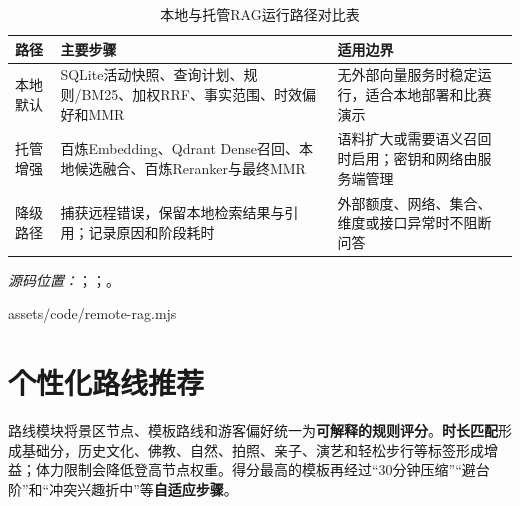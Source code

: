\begin{table}[H]
  \centering
  \small
  \caption{本地与托管RAG运行路径对比表}\label{tab:rag-runtime-paths}
  \begin{tabularx}{\textwidth}{p{}p{}X}
    \toprule
    路径 & 主要步骤 & 适用边界 \\
    \midrule
    本地默认 & SQLite活动快照、查询计划、规则/BM25、加权RRF、事实范围、时效偏好和MMR & 无外部向量服务时稳定运行，适合本地部署和比赛演示 \\
    托管增强 & 百炼Embedding、Qdrant Dense召回、本地候选融合、百炼Reranker与最终MMR & 语料扩大或需要语义召回时启用；密钥和网络由服务端管理 \\
    降级路径 & 捕获远程错误，保留本地检索结果与引用；记录原因和阶段耗时 & 外部额度、网络、集合、维度或接口异常时不阻断问答 \\
    \bottomrule
  \end{tabularx}
\end{table}

\newpage
\noindent\textit{源码位置：}；；。

  {assets/code/remote-rag.mjs}

\newpage
\section{个性化路线推荐}

路线模块将景区节点、模板路线和游客偏好统一为\textbf{可解释的规则评分}。\textbf{时长匹配}形成基础分，历史文化、佛教、自然、拍照、亲子、演艺和轻松步行等标签形成增益；体力限制会降低登高节点权重。得分最高的模板再经过“30分钟压缩”“避台阶”和“冲突兴趣折中”等\textbf{自适应步骤}。


